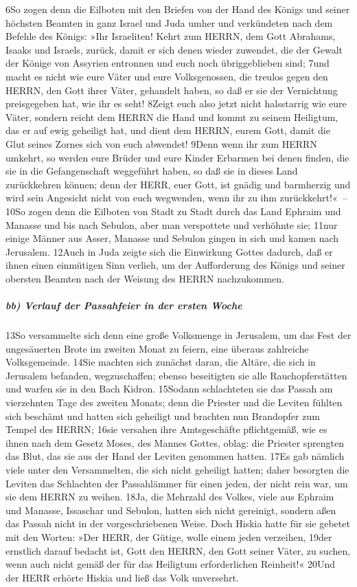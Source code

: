 6So zogen denn die Eilboten mit den Briefen von der Hand des Königs und
seiner höchsten Beamten in ganz Israel und Juda umher und verkündeten
nach dem Befehle des Königs: »Ihr Israeliten! Kehrt zum HERRN, dem Gott
Abrahams, Isaaks und Israels, zurück, damit er sich denen wieder
zuwendet, die der Gewalt der Könige von Assyrien entronnen und euch noch
übriggeblieben sind; 7und macht es nicht wie eure Väter und eure
Volksgenossen, die treulos gegen den HERRN, den Gott ihrer Väter,
gehandelt haben, so daß er sie der Vernichtung preisgegeben hat, wie ihr
es seht! 8Zeigt euch also jetzt nicht halsstarrig wie eure Väter,
sondern reicht dem HERRN die Hand und kommt zu seinem Heiligtum, das er
auf ewig geheiligt hat, und dient dem HERRN, eurem Gott, damit die Glut
seines Zornes sich von euch abwendet! 9Denn wenn ihr zum HERRN umkehrt,
so werden eure Brüder und eure Kinder Erbarmen bei denen finden, die sie
in die Gefangenschaft weggeführt haben, so daß sie in dieses Land
zurückkehren können; denn der HERR, euer Gott, ist gnädig und barmherzig
und wird sein Angesicht nicht von euch wegwenden, wenn ihr zu ihm
zurückkehrt!«~-- 10So zogen denn die Eilboten von Stadt zu Stadt durch
das Land Ephraim und Manasse und bis nach Sebulon, aber man verspottete
und verhöhnte sie; 11nur einige Männer aus Asser, Manasse und Sebulon
gingen in sich und kamen nach Jerusalem. 12Auch in Juda zeigte sich die
Einwirkung Gottes dadurch, daß er ihnen einen einmütigen Sinn verlieh,
um der Aufforderung des Königs und seiner obersten Beamten nach der
Weisung des HERRN nachzukommen.

\hypertarget{bb-verlauf-der-passahfeier-in-der-ersten-woche}{%
\subparagraph{bb) Verlauf der Passahfeier in der ersten
Woche}\label{bb-verlauf-der-passahfeier-in-der-ersten-woche}}

13So versammelte sich denn eine große Volksmenge in Jerusalem, um das
Fest der ungesäuerten Brote im zweiten Monat zu feiern, eine überaus
zahlreiche Volksgemeinde. 14Sie machten sich zunächst daran, die Altäre,
die sich in Jerusalem befanden, wegzuschaffen; ebenso beseitigten sie
alle Rauchopferstätten und warfen sie in den Bach Kidron. 15Sodann
schlachteten sie das Passah am vierzehnten Tage des zweiten Monats; denn
die Priester und die Leviten fühlten sich beschämt und hatten sich
geheiligt und brachten nun Brandopfer zum Tempel des HERRN; 16sie
versahen ihre Amtsgeschäfte pflichtgemäß, wie es ihnen nach dem Gesetz
Moses, des Mannes Gottes, oblag: die Priester sprengten das Blut, das
sie aus der Hand der Leviten genommen hatten. 17Es gab nämlich viele
unter den Versammelten, die sich nicht geheiligt hatten; daher besorgten
die Leviten das Schlachten der Passahlämmer für einen jeden, der nicht
rein war, um sie dem HERRN zu weihen. 18Ja, die Mehrzahl des Volkes,
viele aus Ephraim und Manasse, Issaschar und Sebulon, hatten sich nicht
gereinigt, sondern aßen das Passah nicht in der vorgeschriebenen Weise.
Doch Hiskia hatte für sie gebetet mit den Worten: »Der HERR, der Gütige,
wolle einem jeden verzeihen, 19der ernstlich darauf bedacht ist, Gott
den HERRN, den Gott seiner Väter, zu suchen, wenn auch nicht gemäß der
für das Heiligtum erforderlichen Reinheit!« 20Und der HERR erhörte
Hiskia und ließ das Volk unversehrt.

